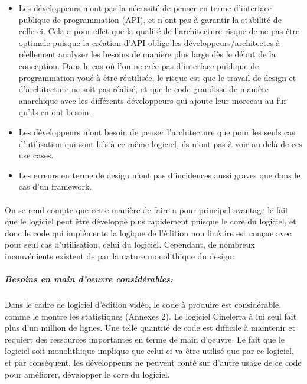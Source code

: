 \begin{itemize} \setlength{\itemsep}{2mm}

  \item {Les développeurs n'ont pas la nécessité de penser
    en terme d'interface publique de programmation (API), et
    n'ont pas à garantir la stabilité de celle-ci. Cela a pour effet que
    la qualité de l'architecture risque de ne pas être optimale puisque
    la création d'API oblige les développeurs/architectes
    à réellement analyser les besoins de manière plus large dès le
    début de la conception. Dans le cas où l'on ne crée pas d'interface
    publique de programmation voué à être réutilisée, le risque est
    que le travail de design et d'architecture ne soit pas réalisé,
    et que le code grandisse de manière anarchique avec les différents
    développeurs qui ajoute leur morceau au fur qu'ils en ont besoin.}

  \item {Les développeurs n'ont besoin de penser l'architecture que pour
    les seuls cas d'utilisation qui sont liés à ce même logiciel,
    ils n'ont pas à voir au delà de ces use cases.}

  \item {Les erreurs en terme de design n'ont pas d'incidences aussi
    graves que dans le cas d'un framework.}
\end {itemize}

\paragraph{}

On se rend compte que cette manière de faire a pour principal avantage
le fait que le logiciel peut être développé plus rapidement puisque
le core du logiciel, et donc le code qui implémente la logique de
l'édition non linéaire est conçue avec pour seul cas d'utilisation,
celui du logiciel. Cependant, de nombreux inconvénients existent de
par la nature monolithique du design:

\subparagraph{Besoins en main d'oeuvre considérables:}

\subparagraph { }

Dans le cadre de logiciel d'édition vidéo, le code à produire est
considérable, comme le montre les statistiques (Annexes 2). Le logiciel
Cinelerra à lui seul fait plus d'un million de lignes. Une telle
quantité de code est difficile à maintenir et requiert des ressources
importantes en terme de main d'oeuvre. Le fait que le logiciel soit
monolithique implique que celui-ci va être utilisé
que par ce logiciel, et par conséquent, les développeurs ne peuvent
conté sur d'autre usage de ce code pour améliorer, développer le core
du logiciel.

